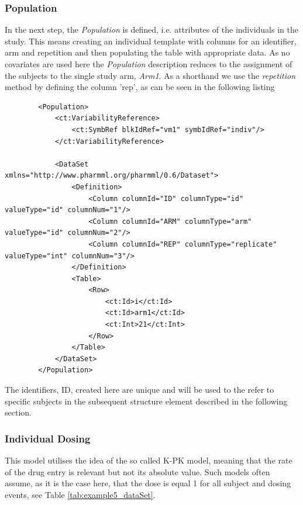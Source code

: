 \subsubsection{Population}
In the next step, the \textit{Population} is defined, i.e. attributes of the individuals in the study. 
This means creating an individual template with columns for an identifier, arm and repetition and then
populating the table with appropriate data.
As no covariates are used here the \textit{Population} description reduces to the assignment 
of the subjects to the single study arm, \textit{Arm1}. As a shorthand we use the
\textit{repetition} method by defining the column 'rep', as can be seen in the following listing 
\lstset{language=XML}
\begin{lstlisting}
        <Population> 
            <ct:VariabilityReference>
                <ct:SymbRef blkIdRef="vm1" symbIdRef="indiv"/>
            </ct:VariabilityReference>
            
            <DataSet xmlns="http://www.pharmml.org/pharmml/0.6/Dataset">
                <Definition>
                    <Column columnId="ID" columnType="id" valueType="id" columnNum="1"/> 
                    <Column columnId="ARM" columnType="arm" valueType="id" columnNum="2"/> 
                    <Column columnId="REP" columnType="replicate" valueType="int" columnNum="3"/> 
                </Definition>
                <Table>
                    <Row>
                        <ct:Id>i</ct:Id>
                        <ct:Id>arm1</ct:Id>
                        <ct:Int>21</ct:Int>
                    </Row>
                </Table>
            </DataSet>
        </Population>
\end{lstlisting}

The identifiers, ID, created here are unique and will be used to the refer to specific subjects 
in the subsequent  structure element described in the following section.


\subsubsection{Individual Dosing}
\label{subsubsec:Ribba_indivDosing}

This model utilises the idea of the so called K-PK model, meaning that the rate of the drug entry is relevant
but not its absolute value. Such models often assume, as it is the case here, that the dose is equal 1
for all subject and dosing events, see Table \ref{tab:example5_dataSet}.

